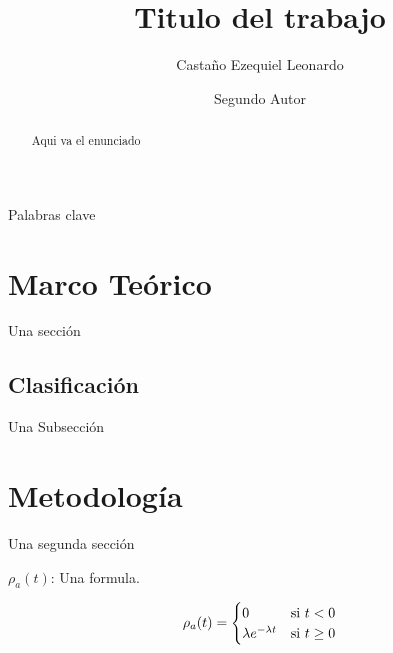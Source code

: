 





\begin{frontmatter}

\title{Titulo del trabajo}

\author[First]{Castaño Ezequiel Leonardo}
\author[First]{Segundo Autor}


\address[First]{Filiación de los autores }

\begin{abstract}

Aqui va el enunciado

\end{abstract}


\begin{keyword}

Palabras clave

\end{keyword}


\end{frontmatter}

\section{Marco Teórico} \label{s:1}

Una sección

\subsection{Clasificación}

Una Subsección

\section{Metodología}

Una segunda sección

$\rho_a(t)$: Una formula.

\begin{equation} \label{11}
  \rho_a(t) =
    \begin{cases}
      $0$ & \text{si $t<0$}\\
      \lambda e^{-\lambda t} & \text{si $t\geq 0$}
    \end{cases}
\end{equation}


